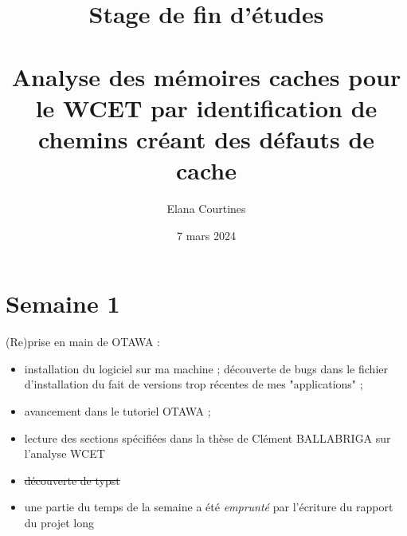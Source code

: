\documentclass[a4paper,12pt]{article}
\title{Stage de fin d'études\\ \vspace*{20mm} \scalebox{2}{Rapport d'avancement}\\ \vspace*{20mm} Analyse des mémoires caches pour le WCET par identification de chemins créant des défauts de cache}
\author{Elana Courtines}
\date{7 mars 2024}
\begin{document}
\maketitle


\section{Semaine 1}

(Re)prise en main de OTAWA :

\begin{itemize}
    \item installation du logiciel sur ma machine ; découverte de bugs dans le fichier d'installation du fait de versions trop récentes de mes "applications" ;
    \item avancement dans le tutoriel OTAWA ;
    \item lecture des sections spécifiées dans la thèse de Clément BALLABRIGA sur l'analyse WCET
    \item \sout{découverte de typst}
    \item une partie du temps de la semaine a été \textit{emprunté} par l'écriture du rapport du projet long
\end{itemize}
\end{document}
